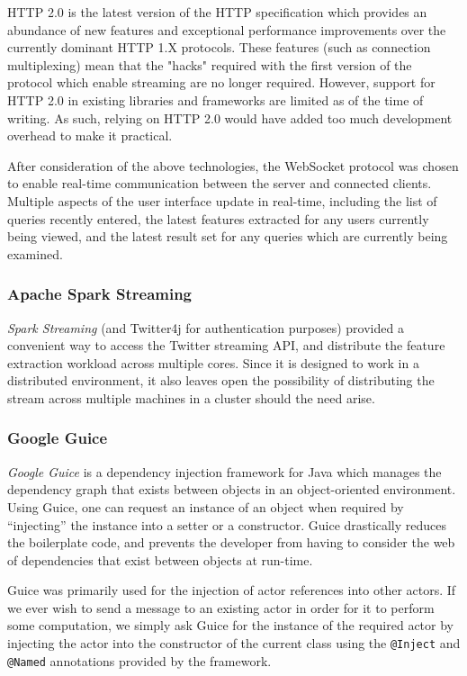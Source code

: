 \documentclass{l4proj}
\newcommand{\code}[1]{\texttt{#1}}
\begin{document}
        HTTP 2.0 is the latest version of the HTTP specification which provides an abundance of new features and exceptional performance improvements over the currently dominant HTTP 1.X protocols. These features (such as connection multiplexing) mean that the "hacks" required with the first version of the protocol which enable streaming are no longer required. However, support for HTTP 2.0 in existing libraries and frameworks are limited as of the time of writing. As such, relying on HTTP 2.0 would have added too much development overhead to make it practical.
        
       After consideration of the above technologies, the WebSocket protocol was chosen to enable real-time communication between the server and connected clients. Multiple aspects of the user interface update in real-time, including the list of queries recently entered, the latest features extracted for any users currently being viewed, and the latest result set for any queries which are currently being examined.

        \subsubsection{Apache Spark Streaming}
        \textit{Spark Streaming} (and Twitter4j for authentication purposes) provided a convenient way to access the Twitter streaming API, and distribute the feature extraction workload across multiple cores. Since it is designed to work in a distributed environment, it also leaves open the possibility of distributing the stream across multiple machines in a cluster should the need arise.

        
        \subsubsection{Google Guice}
        \textit{Google Guice} is a dependency injection framework for Java which manages the dependency graph that exists between objects in an object-oriented environment. Using Guice, one can request an instance of an object when required by “injecting” the instance into a setter or a constructor. Guice drastically reduces the boilerplate code, and prevents the developer from having to consider the web of dependencies that exist between objects at run-time.

Guice was primarily used for the injection of actor references into other actors. If we ever wish to send a message to an existing actor in order for it to perform some computation, we simply ask Guice for the instance of the required actor by injecting the actor into the constructor of the current class using the \code{@Inject} and \code{@Named} annotations provided by the framework.
\end{document}
